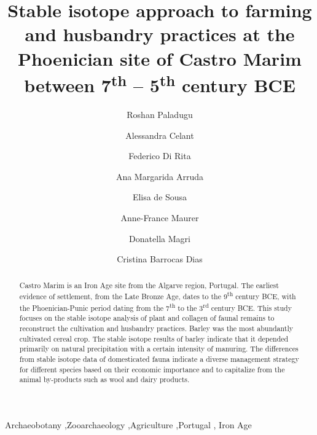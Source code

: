\documentclass[preprint, 3p, authoryear]{elsarticle} %
\begin{document}
\begin{frontmatter}

  \title{Stable isotope approach to farming and husbandry practices at the Phoenician site of Castro Marim between 7\textsuperscript{th} -- 5\textsuperscript{th} century BCE}
    \author[Universidade de Évora,Laboratório HERCULES,Sapienza Università di Roma]{Roshan Paladugu%
  }
    \author[Sapienza Università di Roma]{Alessandra Celant%
  }
    \author[Sapienza Università di Roma]{Federico Di Rita%
  }
    \author[Universidade de Lisboa]{Ana Margarida Arruda%
  }
    \author[Universidade de Lisboa]{Elisa de Sousa%
  }
    \author[Universidade de Évora,Laboratório HERCULES]{Anne-France Maurer%
  }
    \author[Sapienza Università di Roma]{Donatella Magri%
  }
    \author[Universidade de Évora,Laboratório HERCULES]{Cristina Barrocas Dias%
  }
  
  \begin{abstract}
  Castro Marim is an Iron Age site from the Algarve region, Portugal. The earliest evidence of settlement, from the Late Bronze Age, dates to the 9\textsuperscript{th} century BCE, with the Phoenician-Punic period dating from the 7\textsuperscript{th} to the 3\textsuperscript{rd} century BCE. This study focuses on the stable isotope analysis of plant and collagen of faunal remains to reconstruct the cultivation and husbandry practices. Barley was the most abundantly cultivated cereal crop. The stable isotope results of barley indicate that it depended primarily on natural precipitation with a certain intensity of manuring. The differences from stable isotope data of domesticated fauna indicate a diverse management strategy for different species based on their economic importance and to capitalize from the animal by-products such as wool and dairy products.
  \end{abstract}
    \begin{keyword}
    Archaeobotany \sep Zooarchaeology \sep Agriculture \sep Portugal \sep 
    Iron Age
  \end{keyword}
  

\end{frontmatter}
\end{document}

